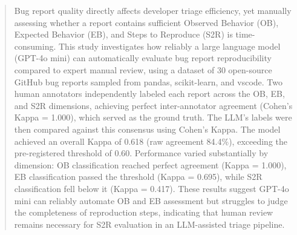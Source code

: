 \begin{abstract}
Bug report quality directly affects developer triage efficiency, yet manually assessing whether a report contains sufficient Observed Behavior (OB), Expected Behavior (EB), and Steps to Reproduce (S2R) is time-consuming. This study investigates how reliably a large language model (GPT-4o mini) can automatically evaluate bug report reproducibility compared to expert manual review, using a dataset of 30 open-source GitHub bug reports sampled from pandas, scikit-learn, and vscode. Two human annotators independently labeled each report across the OB, EB, and S2R dimensions, achieving perfect inter-annotator agreement (Cohen's Kappa = 1.000), which served as the ground truth. The LLM's labels were then compared against this consensus using Cohen's Kappa. The model achieved an overall Kappa of 0.618 (raw agreement 84.4\%), exceeding the pre-registered threshold of 0.60. Performance varied substantially by dimension: OB classification reached perfect agreement (Kappa = 1.000), EB classification passed the threshold (Kappa = 0.695), while S2R classification fell below it (Kappa = 0.417). These results suggest GPT-4o mini can reliably automate OB and EB assessment but struggles to judge the completeness of reproduction steps, indicating that human review remains necessary for S2R evaluation in an LLM-assisted triage pipeline.
\end{abstract}
